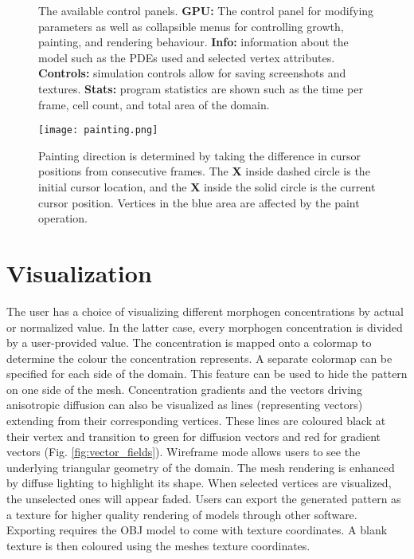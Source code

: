 \begin{figure}[ht]
	\centering
	\caption[The available control panels]{The available control panels. \textbf{GPU:} The control panel for modifying parameters as well as collapsible menus for controlling growth, painting, and rendering behaviour. \textbf{Info:} information about the model such as the PDEs used and selected vertex attributes. \textbf{Controls:} simulation controls allow for saving screenshots and textures. \textbf{Stats:} program statistics are shown such as the time per frame, cell count, and total area of the domain.} 
	\label{fig:GUIexample}
\end{figure}

\begin{figure}[ht]
	\centering
	\texttt{[image: painting.png]}	
	\caption[Painting direction is determined by taking the difference in cursor positions from consecutive frames]{Painting direction is determined by taking the difference in cursor positions from consecutive frames. The \textbf{X} inside dashed circle is the initial cursor location, and the \textbf{X} inside the solid circle is the current cursor position. Vertices in the blue area are affected by the paint operation.} 
	\label{fig:painting}
\end{figure}

\section{Visualization}
The user has a choice of visualizing different morphogen concentrations by actual or normalized value. In the latter case, every morphogen concentration is divided by a user-provided value. The concentration is mapped onto a colormap to determine the colour the concentration represents. A separate colormap can be specified for each side of the domain. This feature can be used to hide the pattern on one side of the mesh. Concentration gradients and the vectors driving anisotropic diffusion can also be visualized as lines (representing vectors) extending from their corresponding vertices. These lines are coloured black at their vertex and transition to green for diffusion vectors and red for gradient vectors (Fig. \ref{fig:vector_fields}). Wireframe mode allows users to see the underlying triangular geometry of the domain. The mesh rendering is enhanced by diffuse lighting to highlight its shape. When selected vertices are visualized, the unselected ones will appear faded. Users can export the generated pattern as a texture for higher quality rendering of models through other software. Exporting requires the OBJ model to come with texture coordinates. A blank texture is then coloured using the meshes texture coordinates.

